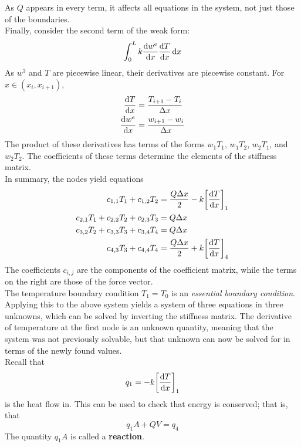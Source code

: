 \documentclass{article}
\begin{document}
			As \(Q\) appears in every term, it affects all equations in the system, not just those of the boundaries. \\
			Finally, consider the second term of the weak form:
				\[\int_0^L k\dv{w^e}{x}\dv{T}{x} \dd{x}\]
			As \(w^3\) and \(T\) are piecewise linear, their derivatives are piecewise constant. For \(x \in (x_i, x_{i + 1})\),
				\begin{align*}
					\dv{T}{x} &= \frac{T_{i + 1} - T_i}{\Delta x} \\
					\dv{w^e}{x} &= \frac{w_{i + 1} - w_i}{\Delta x}
				\end{align*}
			The product of these derivatives has terms of the forms \(w_1T_1\), \(w_1T_2\), \(w_2T_1\), and \(w_2T_2\). The coefficients of these terms determine the elements of the stiffness matrix. \\
			In summary, the nodes yield equations
				\begin{align}
					c_{1, 1}T_1 + c_{1, 2}T_2 &= \frac{Q\Delta x}{2} - k\qty[\dv{T}{x}]_1\\
					c_{2, 1}T_1 + c_{2, 2}T_2 + c_{2, 3}T_3 &= Q\Delta x \\
					c_{3, 2}T_2 + c_{3, 3}T_3 + c_{3, 4}T_4 &= Q\Delta x \\
					c_{4, 3}T_3 + c_{4, 4}T_4 &= \frac{Q\Delta x}{2} + k\qty[\dv{T}{x}]_4
				\end{align}
			The coefficients \(c_{i, j}\) are the components of the coefficient matrix, while the terms on the right are those of the force vector. \\
			The temperature boundary condition \(T_1 = T_0\) is an \textit{essential boundary condition}. Applying this to the above system yields a system of three equations in three unknowns, which can be solved by inverting the stiffness matrix. The derivative of temperature at the first node is an unknown quantity, meaning that the system was not previously solvable, but that unknown can now be solved for in terms of the newly found values. \\
			Recall that
				\[q_1 = -k\qty[\dv{T}{x}]_1\]
			is the heat flow in. This can be used to check that energy is conserved; that is, that
				\[q_1A + QV = q_4\]
			The quantity \(q_1A\) is called a \textbf{reaction}.
\end{document}
